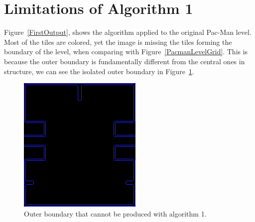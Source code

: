 \section{Limitations of Algorithm 1}
Figure~\ref{FirstOutput}, shows the algorithm applied to the original Pac-Man level. Most of the tiles are colored, yet the image is missing the tiles forming the boundary of the level, when comparing with Figure~\ref{PacmanLevelGrid}. This is because the outer boundary is fundamentally different from the central ones in structure, we can see the isolated outer boundary in Figure~\ref{OuterBoundary}.
\begin{figure}[H]
\centering
\includegraphics[width=0.6\linewidth]{Image-11.png}
\caption {Outer boundary that cannot be produced with algorithm 1.\autocite{pittman_pac-man_2009}}\label{OuterBoundary}
\end{figure}
